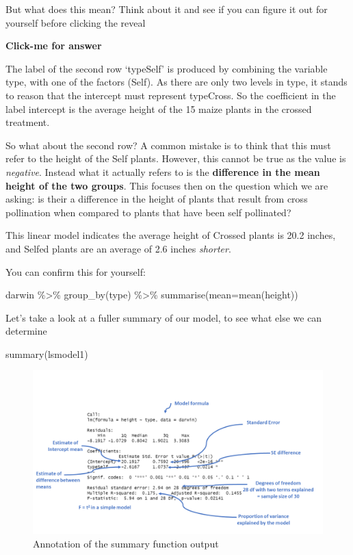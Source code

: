\documentclass[
]{book}
\newenvironment{Shaded}{\begin{snugshade}}{\end{snugshade}}
\newcommand{\AttributeTok}[1]{\textcolor[rgb]{0.77,0.63,0.00}{#1}}
\newcommand{\FunctionTok}[1]{\textcolor[rgb]{0.00,0.00,0.00}{#1}}
\newcommand{\NormalTok}[1]{#1}
\newcommand{\SpecialCharTok}[1]{\textcolor[rgb]{0.00,0.00,0.00}{#1}}
\begin{document}
But what does this mean? Think about it and see if you can figure it out for yourself before clicking the reveal

\textbf{Click-me for answer}

The label of the second row `typeSelf' is produced by combining the variable type, with one of the factors (Self). As there are only two levels in type, it stands to reason that the intercept must represent typeCross. So the coefficient in the label intercept is the average height of the 15 maize plants in the crossed treatment.

So what about the second row? A common mistake is to think that this must refer to the height of the Self plants. However, this cannot be true as the value is \emph{negative}. Instead what it actually refers to is the \textbf{difference in the mean height of the two groups}. This focuses then on the question which we are asking: is their a difference in the height of plants that result from cross pollination when compared to plants that have been self pollinated?

This linear model indicates the average height of Crossed plants is 20.2 inches, and Selfed plants are an average of 2.6 inches \emph{shorter}.

You can confirm this for yourself:

\begin{Shaded}
\begin{Highlighting}[]
\NormalTok{darwin }\SpecialCharTok{\%\textgreater{}\%} 
  \FunctionTok{group\_by}\NormalTok{(type) }\SpecialCharTok{\%\textgreater{}\%} 
  \FunctionTok{summarise}\NormalTok{(}\AttributeTok{mean=}\FunctionTok{mean}\NormalTok{(height))}
\end{Highlighting}
\end{Shaded}

Let's take a look at a fuller summary of our model, to see what else we can determine

\begin{Shaded}
\begin{Highlighting}[]
\FunctionTok{summary}\NormalTok{(lsmodel1)}
\end{Highlighting}
\end{Shaded}

\begin{figure}
\includegraphics[width=0.8\linewidth]{images/model summary} \caption{Annotation of the summary function output}\label{fig:unnamed-chunk-389}
\end{figure}
\end{document}
